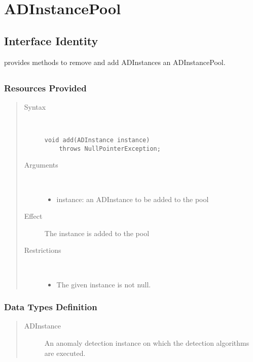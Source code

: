 \section{ADInstancePool}
\label{api:ad-instance-pool}

\subsection{Interface Identity}

\npar {} provides methods to remove and add
ADInstances an ADInstancePool.

\subsection{}

\subsubsection{Resources Provided}

\begin{quote}
	\begin{description}
		\item[Syntax] \ 
		\begin{verbatim}
void add(ADInstance instance) 
    throws NullPointerException;
		\end{verbatim}
		\item[Arguments] \
		\begin{itemize}
			\item instance: an ADInstance to be added to the pool
		\end{itemize}
		\item[Effect] The instance is added to the pool
		\item[Restrictions] \ 
		\begin{itemize}
			\item The given instance is not null.
		\end{itemize}
	\end{description} 
\end{quote}

\subsubsection{Data Types Definition}

\begin{quote}
	\begin{description}
		\item[ADInstance] An anomaly detection instance on which the
		detection algorithms are executed.
	\end{description} 
\end{quote}

